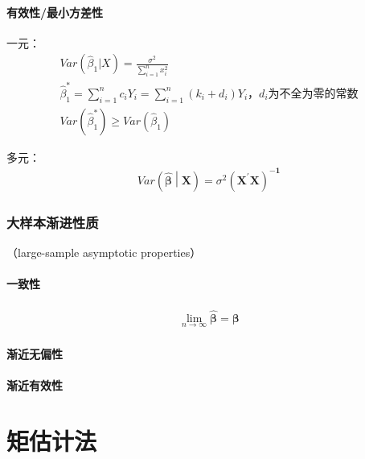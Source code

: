 \documentclass[12pt]{book}
\begin{document}
\paragraph{有效性/最小方差性}

一元：
\begin{gather*}
    Var(\hat{\beta}_1|X)=\frac{\sigma^2}{\sum_{i=1}^{n}x_i^2} \\
    {\hat{\beta}}_1^\ast=\sum_{i=1}^{n}{c_iY_i}=\sum_{i=1}^{n}{\left(k_i+d_i\right)Y_i}，d_i\text{为不全为零的常数}\\
    Var(\hat{\beta}_1^\ast)\geqslant Var(\hat{\beta}_1)
\end{gather*}


多元：
\begin{gather*}
    Var\left(\hat{\bm{\beta}}\middle|\bm{X}\right)=\sigma^2\left(\bm{X}^\prime\bm{X}\right)^{-\bm{1}}
\end{gather*}


\subsubsection{大样本渐进性质}



（large-sample asymptotic properties）
\paragraph{一致性}

\begin{gather*}
    \lim_{n\rightarrow\infty}{\hat{\bm{\beta}}} = \bm{\beta}
\end{gather*}


\paragraph{渐近无偏性}

\paragraph{渐近有效性}


















\section{矩估计法}
\end{document}
